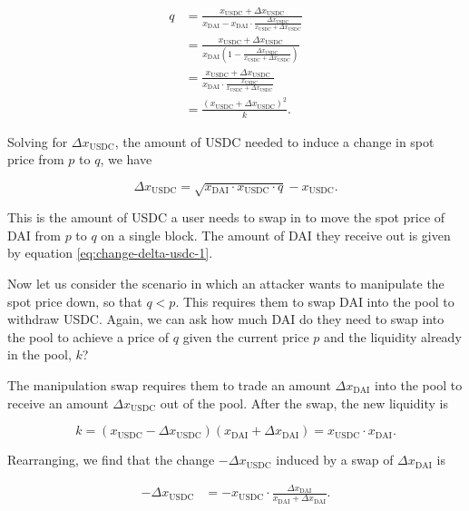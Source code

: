 \documentclass[a4paper, 11pt]{article}
\begin{document}
\begin{align}
q
&=
\frac{x_{\text{USDC}} + \Delta x_{\text{USDC}}}{x_{\text{DAI}} -x_{\text{DAI}} \cdot \frac{\Delta x_{\text{USDC}}}{x_{\text{USDC}} + \Delta x_{\text{USDC}}}} \\ \nonumber
&=
\frac{x_{\text{USDC}} + \Delta x_{\text{USDC}}}{x_{\text{DAI}} \left( 1 - \frac{\Delta x_{\text{USDC}}}{x_{\text{USDC}} + \Delta x_{\text{USDC}}} \right)} \\ \nonumber
&=
\frac{x_{\text{USDC}} + \Delta x_{\text{USDC}}}{x_{\text{DAI}} \cdot \frac{x_{\text{USDC}}}{x_{\text{USDC}} + \Delta x_{\text{USDC}}}} \\ \nonumber
&=
\frac{(x_{\text{USDC}} + \Delta x_{\text{USDC}})^2}{k}.
\end{align}

Solving for $\Delta x_{\text{USDC}}$, the amount of USDC needed to induce a change in spot price from $p$ to $q$, we have

\begin{equation}
\label{eq:change-delta-dai-1}
\Delta x_{\text{USDC}}
=
\sqrt{x_{\text{DAI}} \cdot x_{\text{USDC}} \cdot q} - x_{\text{USDC}}.
\end{equation}

This is the amount of USDC a user needs to swap in to move the spot price of DAI from $p$ to $q$ on a single block. The amount of DAI they receive out is given by equation \eqref{eq:change-delta-usdc-1}. 

Now let us consider the scenario in which an attacker wants to manipulate the spot price down, so that $q < p$. This requires them to swap DAI into the pool to withdraw USDC. Again, we can ask how much DAI do they need to swap into the pool to achieve a price of $q$ given the current price $p$ and the liquidity already in the pool, $k$?

The manipulation swap requires them to trade an amount $\Delta x_{\text{DAI}}$ into the pool to receive an amount $\Delta x_{\text{USDC}}$ out of the pool. After the swap, the new liquidity is

\begin{equation}
k = (x_{\text{USDC}} - \Delta x_{\text{USDC}}) (x_{\text{DAI}} + \Delta x_{\text{DAI}}) = x_{\text{USDC}} \cdot x_{\text{DAI}}.
\end{equation}

Rearranging, we find that the change $-\Delta x_{\text{USDC}}$ induced by a swap of $\Delta x_{\text{DAI}}$ is 

\begin{align}
\label{eq:change-delta-dai-2}
-\Delta x_{\text{USDC}} 
&= 
-x_{\text{USDC}} \cdot \frac{\Delta x_{\text{DAI}}}{x_{\text{DAI}} + \Delta x_{\text{DAI}}}.
\end{align}
\end{document}
